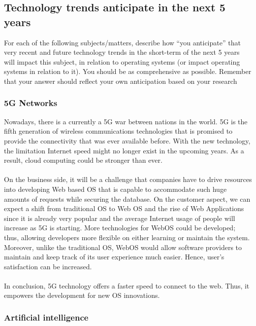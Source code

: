 \newpage
\subsection{Technology trends anticipate in the next 5 years}
For each of the following subjects/matters, describe how “you anticipate” that very recent
and future technology trends in the short-term of the next 5 years will impact this subject, in
relation to operating systems (or impact operating systems in relation to it). You should be as
comprehensive as possible. Remember that your answer should reflect your own anticipation
based on your research

\subsubsection{5G Networks}

Nowadays, there is a currently a 5G war between nations in the world. 
5G is the fifth generation of wireless communications technologies that is promised to provide the connectivity that was ever available before. 
With the new technology, the limitation Internet speed might no longer exist in the upcoming years. As a result, cloud computing could be stronger than ever.\\
\\
On the business side, it will be a challenge that companies have to drive resources into developing Web based OS that is capable to accommodate such huge amounts of requests while securing the database. 
On the customer aspect, we can expect a shift from traditional OS to Web OS and the rise of Web Applications since it is already very popular and the average Internet usage of people will increase as 5G is starting.
More technologies for WebOS could be developed; thus, allowing developers more flexible on either learning or maintain the system. 
Moreover, unlike the traditional OS, WebOS would allow software providers to maintain and keep track of its user experience much easier. Hence, user's satisfaction can be increased. \\
\\
In conclusion, 5G technology offers a faster speed to connect to the web. Thus, it empowers the development for new OS innovations.

\subsubsection{Artificial intelligence}

